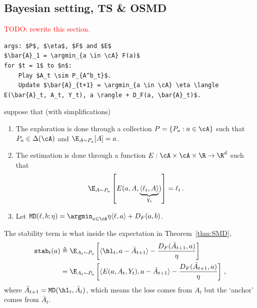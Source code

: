 \subsection{Bayesian setting, TS \& OSMD}
\textcolor{red}{TODO: rewrite  this section.}
\begin{algorithm}[h!]
    \begin{minipage}{12cm}
        \begin{mdframed}
            \begin{lstlisting}
args: $P$, $\eta$, $F$ and $E$ 
$\bar{A}_1 = \argmin_{a \in \cA} F(a)$
for $t = 1$ to $n$:
    Play $A_t \sim P_{A^b_t}$.
    Update $\bar{A}_{t+1} = \argmin_{a \in \cA} \eta \langle E(\bar{A}_t, A_t, Y_t), a \rangle + D_F(a, \bar{A}_t)$.
\end{lstlisting}
            \caption{OSMD}\label{alg:OSMD}
        \end{mdframed}
    \end{minipage}
\end{algorithm}
\citet{zimmert2019connections} suppose that (with simplifications)
\begin{enumerate}
    \item The exploration is done through a collection
          $P = \{P_a: a \in \cA\}$ such that $P_a \in \Delta(\cA)$ and
          $\E_{A \sim P_a}[A] = a$.
    \item The estimation is done through a function
          $E: \cA \times \cA \times \R \to \R^d$ such that
          \begin{align*}
              \E_{A \sim P_a}\left[
                  E(a, A, \underbrace{\langle \ell_t, A\rangle}_{Y_t})
                  \right] = \ell_t\,.
          \end{align*}
    \item Let $\texttt{MD}(\ell, b; \eta) = \argmin_{a \in \cA} \eta \langle \ell, a \rangle + D_F(a, b)$.
\end{enumerate}
The stability term is what inside the
expectation in Theorem~\ref{thm:SMD},
\begin{align*}
    \texttt{stab}_t(a) & \triangleq
    \E_{A_t \sim P_a}\left[
        \langle
        \hl_t,
        a - \bar{A}_{t+1}
        \rangle
        - \frac{D_F(\bar{A}_{t+1}, a)}{\eta}
        \right]
    \\
                       & =
    \E_{A_t \sim P_a}\left[
        \langle E(a, A_t, Y_t), a - \bar{A}_{t+1} \rangle
        - \frac{D_F(\bar{A}_{t+1}, a)}{\eta}
        \right]\,,
\end{align*}
where $\bar{A}_{t+1} = \texttt{MD}(\hl_t, \bar{A}_t)$,
which means the loss comes from $A_t$ but the `anchor' comes from $\bar{A}_t$.

